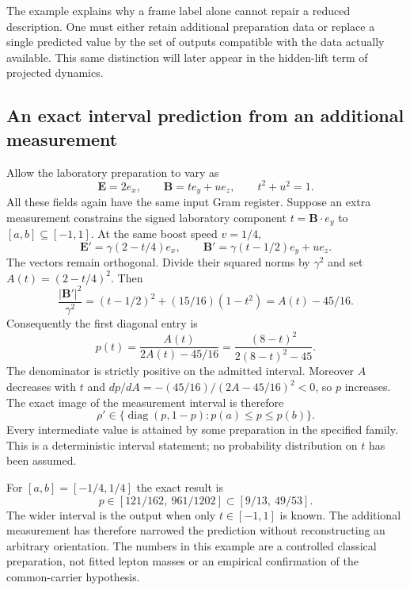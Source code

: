 \documentclass[11pt,a4paper]{article}
\begin{document}
The example explains why a frame label alone cannot repair a reduced
description. One must either retain additional preparation data or
replace a single predicted value by the set of outputs compatible
with the data actually available. This same distinction will later
appear in the hidden-lift term of projected dynamics.

\subsection{An exact interval prediction from an additional measurement}
Allow the laboratory preparation to vary as
\begin{equation}
 \boldsymbol E=2e_x,\qquad
 \boldsymbol B=t e_y+u e_z,\qquad t^2+u^2=1.
\end{equation}
All these fields again have the same input Gram register. Suppose
an extra measurement constrains the signed laboratory component
$t=\boldsymbol B\cdot e_y$ to $[a,b]\subseteq[-1,1]$. At the
same boost speed $v=1/4$,
\begin{equation}
 \boldsymbol E'=\gamma(2-t/4)e_x,\qquad
 \boldsymbol B'=\gamma(t-1/2)e_y+u e_z.
\end{equation}
The vectors remain orthogonal. Divide their squared norms by
$\gamma^2$ and set $A(t)=(2-t/4)^2$. Then
\begin{equation}
 \frac{|\boldsymbol B'|^2}{\gamma^2}
 =(t-1/2)^2+(15/16)(1-t^2)=A(t)-45/16.
\end{equation}
Consequently the first diagonal entry is
\begin{equation}
 p(t)=\frac{A(t)}{2A(t)-45/16}
     =\frac{(8-t)^2}{2(8-t)^2-45}.
\end{equation}
The denominator is strictly positive on the admitted interval.
Moreover $A$ decreases with $t$ and
$dp/dA=-(45/16)/(2A-45/16)^2<0$, so $p$ increases. The exact
image of the measurement interval is therefore
\begin{equation}
 \rho'\in\{\operatorname{diag}(p,1-p):p(a)\leq p\leq p(b)\}.
\end{equation}
Every intermediate value is attained by some preparation in the
specified family. This is a deterministic interval statement; no
probability distribution on $t$ has been assumed.

For $[a,b]=[-1/4,1/4]$ the exact result is
\begin{equation}
 p\in[121/162,\ 961/1202]
      \subset[9/13,\ 49/53].
\end{equation}
The wider interval is the output when only $t\in[-1,1]$ is known.
The additional measurement has therefore narrowed the prediction
without reconstructing an arbitrary orientation. The numbers in
this example are a controlled classical preparation, not fitted
lepton masses or an empirical confirmation of the common-carrier
hypothesis.
\end{document}
